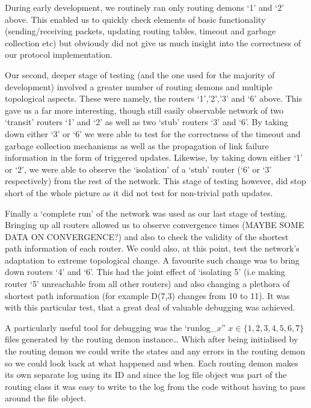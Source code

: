 \documentclass[12pt,twoside]{article}
\begin{document}
During early development, we routinely ran only routing demons ‘1’ and ‘2’ above. This enabled us to quickly check elements of basic functionality (sending/receiving packets, updating routing tables, timeout and garbage collection etc) but obviously did not give us much insight into the correctness of our protocol implementation.

Our second, deeper stage of testing (and the one used for the majority of development) involved a greater number of routing demons and multiple topological aspects. These were namely, the routers ‘1’,’2’,’3’ and ‘6’ above. This gave us a far more interesting, though still easily observable network of two ‘transit’ routers ‘1’ and ‘2’ as well as two ‘stub’ routers ‘3’ and ‘6’. By taking down either ‘3’ or ‘6’ we were able to test for the correctness of the timeout and garbage collection mechanisms as well as the propagation of link failure information in the form of triggered updates. Likewise, by taking down either ‘1’ or ‘2’, we were able to observe the ‘isolation’ of a ‘stub’ router (‘6’ or ‘3’ respectively) from the rest of the network. This stage of testing however, did stop short of the whole picture as it did not test for non-trivial path updates.

Finally a ‘complete run’ of the network was used as our last stage of testing. Bringing up all routers allowed us to observe convergence times (MAYBE SOME DATA ON CONVERGENCE?) and also to check the validity of the shortest path information of each router. We could also, at this point, test the network’s adaptation to extreme topological change. A favourite such change was to bring down routers ‘4’ and ‘6’. This had the joint effect of ‘isolating 5’ (i.e making router ‘5’ unreachable from all other routers) and also changing a plethora of shortest path information (for example D(7,3) changes from 10 to 11). It was with this particular test, that a great deal of valuable debugging was achieved.

A particularly useful tool for debugging was the ‘runlog\_$x$” $x\in \{1,2,3,4,5,6,7\}$files generated by the routing demon instance… Which after being initialised by the routing demon we could write the states and any errors in the routing demon so we could look back at what happened and when. Each routing demon makes its own separate log using its ID and since the log file object was part of the routing class it was easy to write to the log from the code without having to pass around the file object. 
\end{document}
